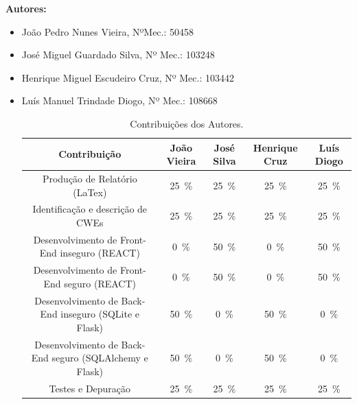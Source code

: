         \textbf{Autores:}
        \begin{itemize}
            \item João Pedro Nunes Vieira, NºMec.: 50458
            \item José Miguel Guardado Silva, Nº Mec.: 103248
            \item Henrique Miguel Escudeiro Cruz, Nº Mec.: 103442
            \item Luís Manuel Trindade Diogo, Nº Mec.: 108668

        \begin{table}[H]
            \centering
            \caption{Contribuições dos Autores.}
            \small
            \begin{tabular}{|c|c|c|c|c|}\hline
                Contribuição & João Vieira & José Silva & Henrique Cruz & Luís Diogo  \\ 
                \hline
        	    Produção de Relatório (LaTex)                           & 25~\% & 25~\% & 25~\% & 25~\% \\
                Identificação e descrição de CWEs                       & 25~\% & 25~\% & 25~\% & 25~\% \\
                Desenvolvimento de Front-End inseguro (REACT)           & 0~\% & 50~\% & 0~\% & 50~\% \\
                Desenvolvimento de Front-End seguro (REACT)             & 0~\% & 50~\% & 0~\% & 50~\% \\
                Desenvolvimento de Back-End inseguro (SQLite e Flask)   & 50~\% & 0~\% & 50~\% & 0~\% \\
        	    Desenvolvimento de Back-End seguro (SQLAlchemy e Flask) & 50~\% & 0~\% & 50~\% & 0~\% \\
                Testes e Depuração                                      & 25~\% & 25~\% & 25~\% & 25~\% \\   
            \hline
            \end{tabular}
            \label{tab.contribuições}
        \end{table}	
        
        
        \end{itemize}

